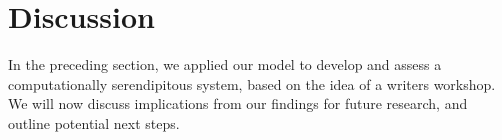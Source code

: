 
\section{Discussion} \label{sec:discussion}
In the preceding section, we applied our model to develop and assess a computationally serendipitous system, based on the idea of a writers workshop. We will now discuss implications from our findings for future research, and outline potential next steps.




